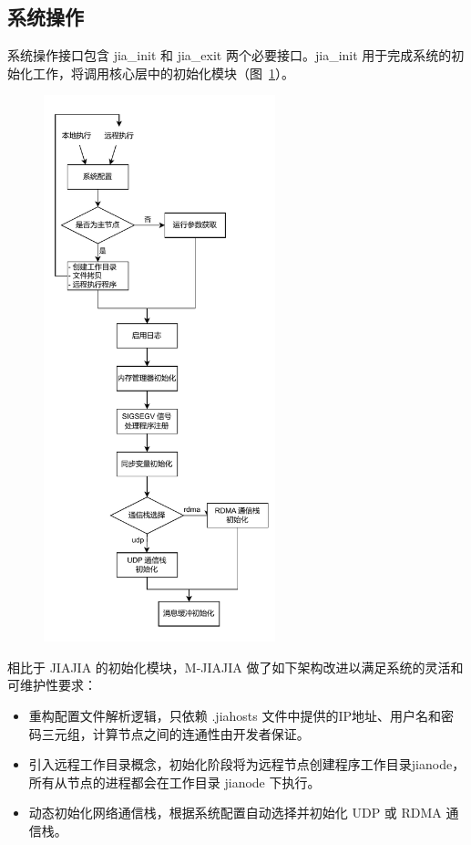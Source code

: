 {    \subsection{系统操作}\label{sec:init}
    系统操作接口包含 jia\_init 和 jia\_exit 两个必要接口。jia\_init 用于完成系统的初始化工作，将调用核心层中的初始化模块（图~\ref{fig:mjiajia-init}）。
    \begin{figure}[!htbp]
        \centering
        \includegraphics[width=0.6\textwidth]{Img/M-JIAJIA-初始化模块.drawio.pdf}
        \label{fig:mjiajia-init}
    \end{figure}
    相比于 JIAJIA 的初始化模块，M-JIAJIA 做了如下架构改进以满足系统的灵活和可维护性要求：
    \begin{itemize}
        \item 重构配置文件解析逻辑，只依赖 .jiahosts 文件中提供的IP地址、用户名和密码三元组，计算节点之间的连通性由开发者保证。
        \item 引入远程工作目录概念，初始化阶段将为远程节点创建程序工作目录jianode，所有从节点的进程都会在工作目录 jianode 下执行。
        \item 动态初始化网络通信栈，根据系统配置自动选择并初始化 UDP 或 RDMA 通信栈。
    \end{itemize}

}
